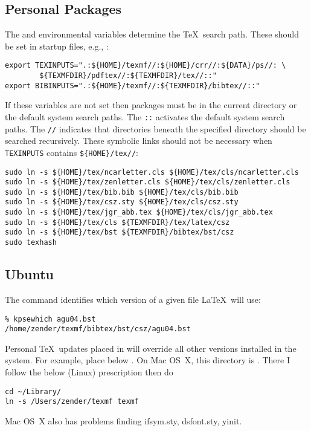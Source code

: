 \documentclass[12pt]{article}
\begin{document}
\subsection[Personal packages]{Personal Packages}\label{sxn:prs}
The  and  environmental variables
determine the \TeX\ search path.
These should be set in startup files, e.g., :
\begin{verbatim}
export TEXINPUTS=".:${HOME}/texmf//:${HOME}/crr//:${DATA}/ps//: \
        ${TEXMFDIR}/pdftex//:${TEXMFDIR}/tex//::" 
export BIBINPUTS=".:${HOME}/texmf//:${TEXMFDIR}/bibtex//::"
\end{verbatim}
If these variables are not set then packages must be in the current
directory or the default system search paths.
The \verb'::' activates the default system search paths.
The \verb'//' indicates that directories beneath the specified
directory should be searched recursively. 
These symbolic links should not be necessary when \verb'TEXINPUTS'
contains \verb'${HOME}/tex//':
\begin{verbatim}
sudo ln -s ${HOME}/tex/ncarletter.cls ${HOME}/tex/cls/ncarletter.cls
sudo ln -s ${HOME}/tex/zenletter.cls ${HOME}/tex/cls/zenletter.cls
sudo ln -s ${HOME}/tex/bib.bib ${HOME}/tex/cls/bib.bib
sudo ln -s ${HOME}/tex/csz.sty ${HOME}/tex/cls/csz.sty
sudo ln -s ${HOME}/tex/jgr_abb.tex ${HOME}/tex/cls/jgr_abb.tex
sudo ln -s ${HOME}/tex/cls ${TEXMFDIR}/tex/latex/csz
sudo ln -s ${HOME}/tex/bst ${TEXMFDIR}/bibtex/bst/csz
sudo texhash
\end{verbatim}

\subsection[Ubuntu]{Ubuntu}\label{sxn:bnt}
The command  identifies which version of a
given file \LaTeX\ will use: 
\begin{verbatim}
% kpsewhich agu04.bst
/home/zender/texmf/bibtex/bst/csz/agu04.bst
\end{verbatim}
Personal \TeX\ updates placed in  will override all
other versions installed in the system.
For example, place  below .
On Mac OS~X, this directory is \flidx{~/Library/texmf}.
There I follow the below (Linux) prescription then do
\begin{verbatim}
cd ~/Library/
ln -s /Users/zender/texmf texmf
\end{verbatim}
Mac OS~X also has problems finding ifsym.sty, dsfont.sty, yinit.
\end{document}
